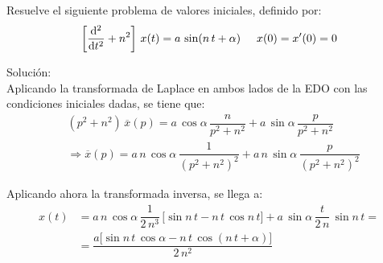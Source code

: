 \begin{ejemplo}
Resuelve el siguiente problema de valores iniciales, definido por:
\begin{align*}
\left[ \dv[2]{t} + n^{2}\right] \, x(t) = a \, \sin (n \, t +  \alpha) \hspace{0.5cm} x(0) = {x}^{\prime}(0) = 0
\end{align*}

\noindent Solución:
\\[0.5em]
Aplicando la transformada de Laplace en ambos lados de la EDO con las condiciones iniciales dadas, se tiene que:
\begin{align*}
&(p^{2} + n^{2}) \, \overline{x}(p) = a \, \cos \alpha \, \dfrac{n}{p^{2} + n^{2}} +  a \, \sin \alpha \, \dfrac{p}{p^{2} + n^{2}} \\[0.5em]
&\Rightarrow \overline{x}(p) = a \, n \, \cos \alpha \, \dfrac{1}{(p^{2} + n^{2})^{2}} + a \, n \, \sin \alpha \, \dfrac{p}{(p^{2} + n^{2})^{2}}
\end{align*}

Aplicando ahora la transformada inversa, se llega a:
\begin{align*}
x(t) &= a \, n \, \cos \alpha \, \dfrac{1}{2 \, n^{3}} \, \big[\sin n \, t - n \, t \, \cos n \, t \big] + a \, \sin \alpha \, \dfrac{t}{2 \, n} \, \sin n \, t = \\[0.5em]
&= \dfrac{a \big[\sin n \, t \, \cos \alpha - n \, t \, \cos (n \, t +  \alpha)]}{2 \, n^{2}}
\end{align*}
\end{ejemplo}

